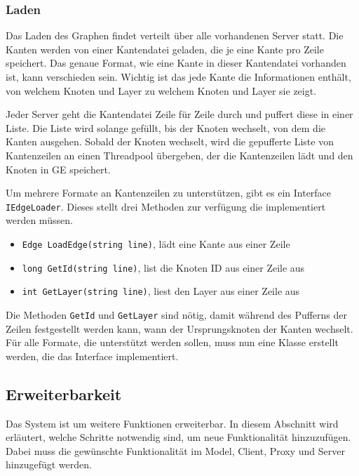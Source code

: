 \subsubsection{Laden}

Das Laden des Graphen findet verteilt über alle vorhandenen Server statt. Die Kanten werden von einer Kantendatei geladen, die je eine Kante pro Zeile speichert. Das genaue Format, wie eine Kante in dieser Kantendatei vorhanden ist, kann verschieden sein. Wichtig ist das jede Kante die Informationen enthält, von welchem Knoten und Layer zu welchem Knoten und Layer sie zeigt.

Jeder Server geht die Kantendatei Zeile für Zeile durch und puffert diese in einer Liste. Die Liste wird solange gefüllt, bis der Knoten wechselt, von dem die Kanten ausgehen. Sobald der Knoten wechselt, wird die gepufferte Liste von Kantenzeilen an einen Threadpool übergeben, der die Kantenzeilen lädt und den Knoten in GE speichert.

Um mehrere Formate an Kantenzeilen zu unterstützen, gibt es ein Interface \verb|IEdgeLoader|. Dieses stellt drei Methoden zur verfügung die implementiert werden müssen.

\begin{itemize}
  \item \verb|Edge LoadEdge(string line)|, lädt eine Kante aus einer Zeile
  \item \verb|long GetId(string line)|, list die Knoten ID aus einer Zeile aus
  \item \verb|int GetLayer(string line)|, liest den Layer aus einer Zeile aus
\end{itemize}

Die Methoden \verb|GetId| und \verb|GetLayer| sind nötig, damit während des Pufferns der Zeilen festgestellt werden kann, wann der Ursprungsknoten der Kanten wechselt.
Für alle Formate, die unterstützt werden sollen, muss nun eine Klasse erstellt werden, die das Interface implementiert.



\subsection{Erweiterbarkeit}

Das System ist um weitere Funktionen erweiterbar. In diesem Abschnitt wird erläutert, welche Schritte notwendig sind, um neue Funktionalität hinzuzufügen.
Dabei muss die gewünschte Funktionalität im Model, Client, Proxy und Server hinzugefügt werden.


